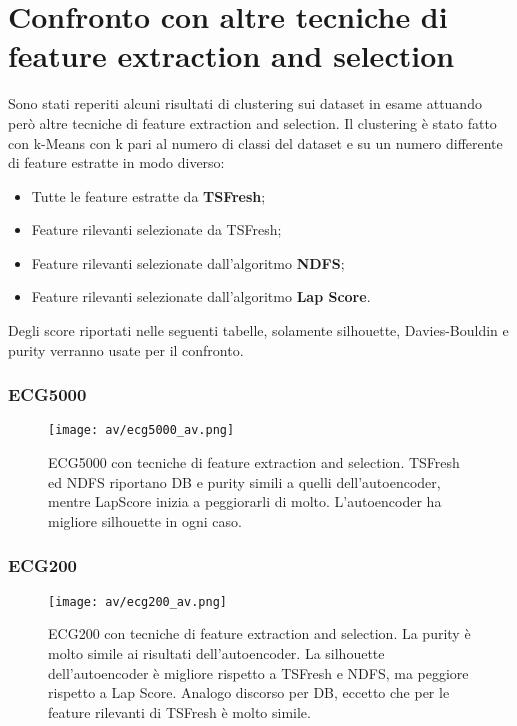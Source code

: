 \section{Confronto con altre tecniche di feature extraction and selection}
Sono stati reperiti alcuni risultati di clustering sui dataset in esame attuando però altre tecniche di feature extraction and selection. Il clustering è stato fatto con k-Means con k pari al numero di classi del dataset e su un numero differente di feature estratte in modo diverso:
\begin{itemize}
	\item Tutte le feature estratte da \textbf{TSFresh};
	\item Feature rilevanti selezionate da TSFresh;
	\item Feature rilevanti selezionate dall'algoritmo \textbf{NDFS};
	\item Feature rilevanti selezionate dall'algoritmo \textbf{Lap Score}.
\end{itemize}
Degli score riportati nelle seguenti tabelle, solamente silhouette, Davies-Bouldin e purity verranno usate per il confronto.

\subsubsection{ECG5000}
\begin{figure}[H]
	\centering
	\texttt{[image: av/ecg5000\_av.png]}
	\caption{ECG5000 con tecniche di feature extraction and selection. TSFresh ed NDFS riportano DB e purity simili a quelli dell'autoencoder, mentre LapScore inizia a peggiorarli di molto. L'autoencoder ha migliore silhouette in ogni caso.}
	\label{fig:ecg5000_av}
\end{figure}

\subsubsection{ECG200}
\begin{figure}[H]
	\centering
	\texttt{[image: av/ecg200\_av.png]}
	\caption{ECG200 con tecniche di feature extraction and selection. La purity è molto simile ai risultati dell'autoencoder. La silhouette dell'autoencoder è migliore rispetto a TSFresh e NDFS, ma peggiore rispetto a Lap Score. Analogo discorso per DB, eccetto che per le feature rilevanti di TSFresh è molto simile.}
	\label{fig:ecg200_av}
\end{figure}

